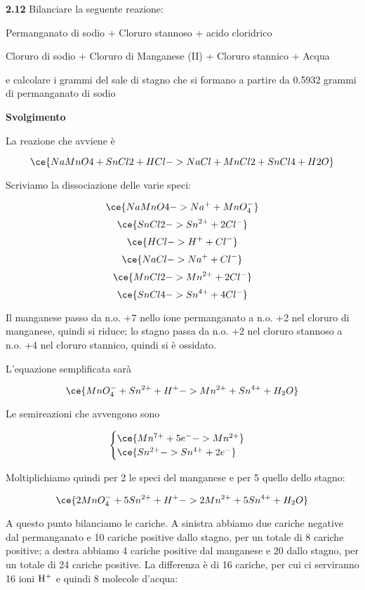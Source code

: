 \vspace{0.2cm}\textbf{2.12} Bilanciare la seguente reazione:

\begin{center}
    Permanganato di sodio + Cloruro stannoso + acido cloridrico \ce{->}

    \ce{->} Cloruro di sodio + Cloruro di Manganese (II) + Cloruro stannico + Acqua
\end{center}

e calcolare i grammi del sale di stagno che si formano a partire da 0.5932 grammi di permanganato di sodio

\vspace{0.2cm}\large\textbf{Svolgimento}\normalsize

\vspace{0.2cm}La reazione che avviene è

$$\ce{NaMnO4 + SnCl2 + HCl -> NaCl + MnCl2 + SnCl4 + H2O}$$

Scriviamo la dissociazione delle varie speci:

$$\ce{NaMnO4 -> Na^+ + MnO_4^-}$$
$$\ce{SnCl2 -> Sn^{2+} + 2Cl^-}$$
$$\ce{HCl -> H^+ + Cl^-}$$
$$\ce{NaCl -> Na^+ + Cl^-}$$
$$\ce{MnCl2 -> Mn^{2+} + 2Cl^-}$$
$$\ce{SnCl4 -> Sn^{4+} + 4Cl^-}$$

Il manganese passo da n.o. +7 nello ione permanganato a n.o. +2 nel cloruro di
manganese, quindi si riduce; lo stagno passa da n.o. +2 nel cloruro stannoso a n.o. +4 nel cloruro stannico, quindi si è ossidato.

L'equazione semplificata sarà

$$\ce{MnO_4^- + Sn^{2+} + H^+ -> Mn^{2+} + Sn^{4+} + H_2O}$$

Le semireazioni che avvengono sono

$$\begin{cases}
    \ce{Mn^{7+} + 5e^- -> Mn^{2+}}\\
    \ce{Sn^{2+} -> Sn^{4+} + 2e^-}
\end{cases}$$

Moltiplichiamo quindi per 2 le speci del manganese e per 5 quello dello stagno:

$$\ce{2MnO_4^- + 5Sn^{2+} + H^+ -> 2Mn^{2+} + 5Sn^{4+} + H_2O}$$

A questo punto bilanciamo le cariche. A sinistra abbiamo due cariche negative dal permanganato e 10 cariche positive dallo stagno, per un totale di 8 cariche positive; a destra abbiamo 4 cariche positive dal manganese e 20 dallo stagno, per un totale di 24 cariche positive. La differenza è di 16 cariche, per cui ci serviranno 16 ioni $\rm H^+$ e quindi 8 molecole d'acqua: 

